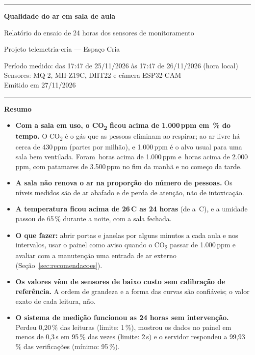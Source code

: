 \documentclass[11pt,a4paper]{article}
\newcommand{\cod}{CO\textsubscript{2}}
\newcommand{\grau}{\,\textdegree C}
\begin{document}
\thispagestyle{empty}
\vspace*{6mm}
{\color{azul}\rule{\linewidth}{2pt}}

\vspace{5mm}
{\Huge\bfseries Qualidade do ar em sala de aula\par}
\vspace{3mm}
{\Large Relatório do ensaio de 24 horas dos sensores de monitoramento\par}
\vspace{5mm}
{\large Projeto telemetria-cria --- Espaço Cria\par}
\vspace{2mm}
{\color{cinza}Período medido: das 17:47 de 25/11/2026 às 17:47 de 26/11/2026 (hora local)\\
Sensores: MQ-2, MH-Z19C, DHT22 e câmera ESP32-CAM\\
Emitido em 27/11/2026\par}
\vspace{5mm}
{\color{azul}\rule{\linewidth}{0.6pt}}

\vspace{5mm}
\begin{destaque}
\textbf{Resumo}

\begin{itemize}[leftmargin=*]
\item \textbf{Com a sala em uso, o \cod{} ficou acima de 1.000\,ppm em \PctUsoAcimaMil\,\% do tempo.} O \cod{} é o gás que as pessoas eliminam ao respirar; ao ar livre há cerca de 430\,ppm (partes por milhão), e 1.000\,ppm é o alvo usual para uma sala bem ventilada. Foram \HorasUsoAcimaMil\,horas acima de 1.000\,ppm e \HorasUsoAcimaDoisMil\,horas acima de 2.000\,ppm, com patamares de 3.500\,ppm no fim da manhã e no começo da tarde.
\item \textbf{A sala não renova o ar na proporção do número de pessoas.} Os níveis medidos são de ar abafado e de perda de atenção, não de intoxicação.
\item \textbf{A temperatura ficou acima de 26\grau{} as 24 horas} (de \TeTudoMin{} a \TeTudoMax\grau), e a umidade passou de 65\,\% durante a noite, com a sala fechada.
\item \textbf{O que fazer:} abrir portas e janelas por alguns minutos a cada aula e nos intervalos, usar o painel como aviso quando o \cod{} passar de 1.000\,ppm e avaliar com a manutenção uma entrada de ar externo (Seção~\ref{sec:recomendacoes}).
\item \textbf{Os valores vêm de sensores de baixo custo sem calibração de referência.} A ordem de grandeza e a forma das curvas são confiáveis; o valor exato de cada leitura, não.
\item \textbf{O sistema de medição funcionou as 24 horas sem intervenção.} Perdeu 0,20\,\% das leituras (limite: 1\,\%), mostrou os dados no painel em menos de 0,3\,s em 95\,\% das vezes (limite: 2\,s) e o servidor respondeu a 99,93\,\% das verificações (mínimo: 95\,\%).
\end{itemize}
\end{destaque}
\end{document}
